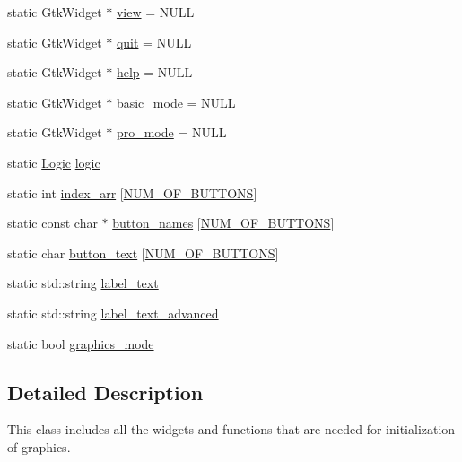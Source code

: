 \begin{DoxyCompactItemize}
\item 
static Gtk\+Widget $\ast$ \mbox{\hyperlink{class_g_u_i_a3ecda752022bea96ce708bcb6566cea6}{view}} = N\+U\+LL
\item 
static Gtk\+Widget $\ast$ \mbox{\hyperlink{class_g_u_i_a9074ece2c54a94cfd0cba3fa1116ca48}{quit}} = N\+U\+LL
\item 
static Gtk\+Widget $\ast$ \mbox{\hyperlink{class_g_u_i_a4fe5d81a72449afa0cbd2228cddd48c0}{help}} = N\+U\+LL
\item 
static Gtk\+Widget $\ast$ \mbox{\hyperlink{class_g_u_i_a846712dc55efc3b44efe70cad65e4f8a}{basic\+\_\+mode}} = N\+U\+LL
\item 
static Gtk\+Widget $\ast$ \mbox{\hyperlink{class_g_u_i_ab7f93bcfb9342c9ea4a53197253e8b10}{pro\+\_\+mode}} = N\+U\+LL
\item 
static \mbox{\hyperlink{class_logic}{Logic}} \mbox{\hyperlink{class_g_u_i_ae76cddcd30061092ac9c1bd4720d3ea2}{logic}}
\item 
static int \mbox{\hyperlink{class_g_u_i_a370dccd74ba9ec5b2b7f16ec17bed2bc}{index\+\_\+arr}} \mbox{[}\mbox{\hyperlink{graphics_8h_ab076d40d6e2ef36100620d3d12ca54dd}{N\+U\+M\+\_\+\+O\+F\+\_\+\+B\+U\+T\+T\+O\+NS}}\mbox{]}
\item 
static const char $\ast$ \mbox{\hyperlink{class_g_u_i_a21c0b141996ee0d0009b86e176024633}{button\+\_\+names}} \mbox{[}\mbox{\hyperlink{graphics_8h_ab076d40d6e2ef36100620d3d12ca54dd}{N\+U\+M\+\_\+\+O\+F\+\_\+\+B\+U\+T\+T\+O\+NS}}\mbox{]}
\item 
static char \mbox{\hyperlink{class_g_u_i_a6d8bc11493b295fc1a37a062634dd7c0}{button\+\_\+text}} \mbox{[}\mbox{\hyperlink{graphics_8h_ab076d40d6e2ef36100620d3d12ca54dd}{N\+U\+M\+\_\+\+O\+F\+\_\+\+B\+U\+T\+T\+O\+NS}}\mbox{]}
\item 
static std\+::string \mbox{\hyperlink{class_g_u_i_a999eed2f94439640a5b3e7381d0486fb}{label\+\_\+text}}
\item 
static std\+::string \mbox{\hyperlink{class_g_u_i_a517b263240970d2867605ea2c7f5fcde}{label\+\_\+text\+\_\+advanced}}
\item 
static bool \mbox{\hyperlink{class_g_u_i_abb868a957e22d3debbf9c707aadfdd44}{graphics\+\_\+mode}}
\end{DoxyCompactItemize}


\subsection{Detailed Description}
This class includes all the widgets and functions that are needed for initialization of graphics. 

